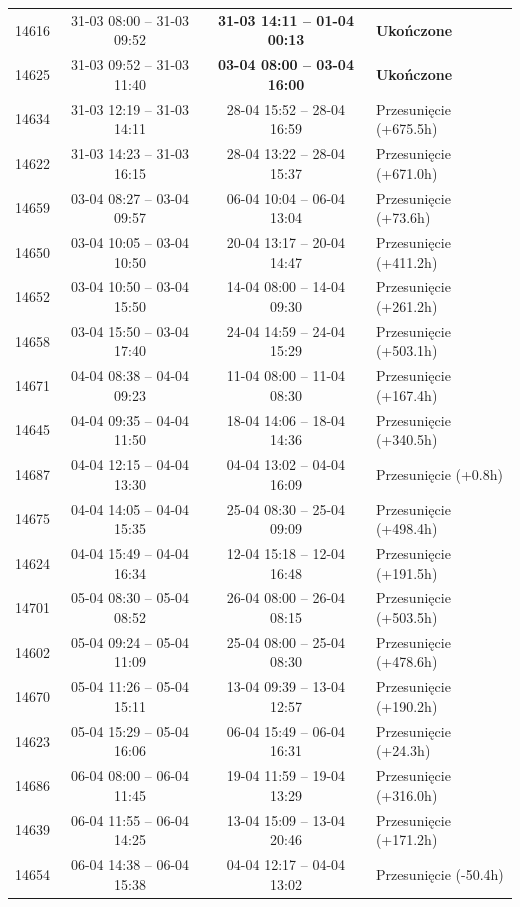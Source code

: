 \begin{table}[htbp]
\begin{tabular}{|r|c|c|l|}
14616 & 31-03 08:00 -- 31-03 09:52 & \textbf{31-03 14:11 -- 01-04 00:13} & \textbf{Ukończone} \\ 
14625 & 31-03 09:52 -- 31-03 11:40 & \textbf{03-04 08:00 -- 03-04 16:00} & \textbf{Ukończone} \\ 
14634 & 31-03 12:19 -- 31-03 14:11 & 28-04 15:52 -- 28-04 16:59 & Przesunięcie (+675.5h) \\ 
14622 & 31-03 14:23 -- 31-03 16:15 & 28-04 13:22 -- 28-04 15:37 & Przesunięcie (+671.0h) \\ 
14659 & 03-04 08:27 -- 03-04 09:57 & 06-04 10:04 -- 06-04 13:04 & Przesunięcie (+73.6h) \\ 
14650 & 03-04 10:05 -- 03-04 10:50 & 20-04 13:17 -- 20-04 14:47 & Przesunięcie (+411.2h) \\ 
14652 & 03-04 10:50 -- 03-04 15:50 & 14-04 08:00 -- 14-04 09:30 & Przesunięcie (+261.2h) \\ 
14658 & 03-04 15:50 -- 03-04 17:40 & 24-04 14:59 -- 24-04 15:29 & Przesunięcie (+503.1h) \\ 
14671 & 04-04 08:38 -- 04-04 09:23 & 11-04 08:00 -- 11-04 08:30 & Przesunięcie (+167.4h) \\ 
14645 & 04-04 09:35 -- 04-04 11:50 & 18-04 14:06 -- 18-04 14:36 & Przesunięcie (+340.5h) \\ 
14687 & 04-04 12:15 -- 04-04 13:30 & 04-04 13:02 -- 04-04 16:09 & Przesunięcie (+0.8h) \\ 
14675 & 04-04 14:05 -- 04-04 15:35 & 25-04 08:30 -- 25-04 09:09 & Przesunięcie (+498.4h) \\ 
14624 & 04-04 15:49 -- 04-04 16:34 & 12-04 15:18 -- 12-04 16:48 & Przesunięcie (+191.5h) \\ 
14701 & 05-04 08:30 -- 05-04 08:52 & 26-04 08:00 -- 26-04 08:15 & Przesunięcie (+503.5h) \\ 
14602 & 05-04 09:24 -- 05-04 11:09 & 25-04 08:00 -- 25-04 08:30 & Przesunięcie (+478.6h) \\ 
14670 & 05-04 11:26 -- 05-04 15:11 & 13-04 09:39 -- 13-04 12:57 & Przesunięcie (+190.2h) \\ 
14623 & 05-04 15:29 -- 05-04 16:06 & 06-04 15:49 -- 06-04 16:31 & Przesunięcie (+24.3h) \\ 
14686 & 06-04 08:00 -- 06-04 11:45 & 19-04 11:59 -- 19-04 13:29 & Przesunięcie (+316.0h) \\ 
14639 & 06-04 11:55 -- 06-04 14:25 & 13-04 15:09 -- 13-04 20:46 & Przesunięcie (+171.2h) \\ 
14654 & 06-04 14:38 -- 06-04 15:38 & 04-04 12:17 -- 04-04 13:02 & Przesunięcie (-50.4h) \\ 

\end{tabular}
\end{table}
